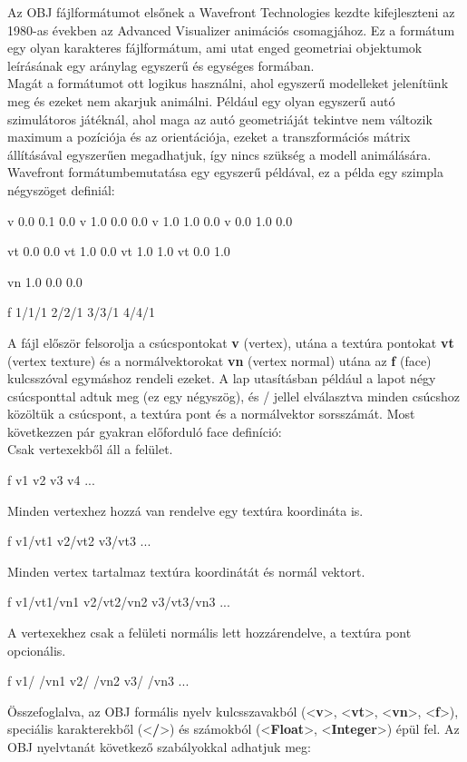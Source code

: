 
Az OBJ fájlformátumot elsőnek a Wavefront Technologies kezdte kifejleszteni az 1980-as években az Advanced Visualizer animációs csomagjához. Ez a formátum egy olyan karakteres fájlformátum, ami utat enged geometriai objektumok leírásának egy aránylag egyszerű és egységes formában. \\
Magát a formátumot ott logikus használni, ahol egyszerű modelleket jelenítünk meg és ezeket nem akarjuk animálni. Például egy olyan egyszerű autó szimulátoros játéknál, ahol maga az autó geometriáját tekintve nem változik maximum a pozíciója és az orientációja, ezeket a transzformációs mátrix állításával egyszerűen megadhatjuk, így nincs szükség a modell animálására.\\
Wavefront formátumbemutatása egy egyszerű példával, ez a példa egy szimpla négyszöget definiál:\\

\begin{cpp} 
v 0.0 0.1 0.0
v 1.0 0.0 0.0
v 1.0 1.0 0.0
v 0.0 1.0 0.0

vt 0.0 0.0
vt 1.0 0.0
vt 1.0 1.0
vt 0.0 1.0

vn 1.0 0.0 0.0 

f 1/1/1 2/2/1 3/3/1 4/4/1
\end{cpp}

A fájl először felsorolja a csúcspontokat \textbf{v} (vertex), utána a textúra pontokat \textbf{vt} (vertex texture) és a normálvektorokat \textbf{vn} (vertex normal) utána  az \textbf{f} (face) kulcsszóval egymáshoz rendeli ezeket. A lap utasításban például a lapot négy csúcsponttal adtuk meg (ez egy négyszög), és / jellel elválasztva minden csúcshoz közöltük a csúcspont, a textúra pont és a normálvektor sorsszámát. Most következzen pár gyakran előforduló face definíció:\\

\noindent Csak vertexekből áll a felület.
\begin{cpp} 
f v1 v2 v3 v4 ...
\end{cpp}
Minden vertexhez hozzá van rendelve egy textúra koordináta is.
\begin{cpp} 
f v1/vt1 v2/vt2 v3/vt3 ...
\end{cpp}
Minden vertex tartalmaz textúra koordinátát és normál vektort.
\begin{cpp} 
f v1/vt1/vn1 v2/vt2/vn2 v3/vt3/vn3 ...
\end{cpp}
A vertexekhez csak a felületi normális lett hozzárendelve, a textúra pont opcionális.
\begin{cpp} 
f v1/ /vn1 v2/ /vn2 v3/ /vn3 ...
\end{cpp}
Összefoglalva, az OBJ formális nyelv kulcsszavakból (<\textbf{v}>, <\textbf{vt}>, <\textbf{vn}>, <\textbf{f}>), speciális karakterekből (<\textbf{/}>) és számokból (<\textbf{Float}>, <\textbf{Integer}>) épül fel. Az OBJ nyelvtanát következő szabályokkal adhatjuk meg:\\


